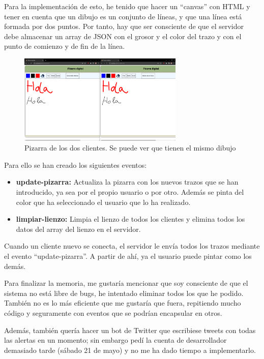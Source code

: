 \documentclass{article}
\begin{document}
Para la implementación de esto, he tenido que hacer un ``canvas'' con HTML y tener en cuenta que un dibujo es un conjunto de líneas, y que una línea está formada por dos puntos. Por tanto, hay que ser consciente de que el servidor debe almacenar un array de JSON con el grosor y el color del trazo y con el punto de comienzo y de fin de la línea.

\begin{figure}[H]
    \centering
    \includegraphics[width=0.7\textwidth]{images/pizarra.png}
    \caption{Pizarra de los dos clientes. Se puede ver que tienen el mismo dibujo}
\end{figure}


Para ello se han creado los siguientes eventos:

\begin{itemize}
    \item \textbf{update-pizarra: }Actualiza la pizarra con los nuevos trazos que se han introducido, ya sea por el propio usuario o por otro. Además se pinta del color que ha seleccionado el usuario que lo ha realizado.
    \item \textbf{limpiar-lienzo: }Limpia el lienzo de todos los clientes y elimina todos los datos del array del lienzo en el servidor.
\end{itemize}

Cuando un cliente nuevo se conecta, el servidor le envía todos los trazos mediante el evento ``update-pizarra''. A partir de ahí, ya el usuario puede pintar como los demás.


Para finalizar la memoria, me gustaría mencionar que soy consciente de que el sistema no está libre de bugs, he intentado eliminar todos los que he podido. También no es lo más eficiente que me gustaría que fuera, repitiendo mucho código y seguramente con eventos que se podrían encapsular en otros.

Además, también quería hacer un bot de Twitter que escribiese tweets con todas las alertas en un momento; sin embargo pedí la cuenta de desarrollador demasiado tarde (sábado 21 de mayo) y no me ha dado tiempo a implementarlo.
\end{document}
